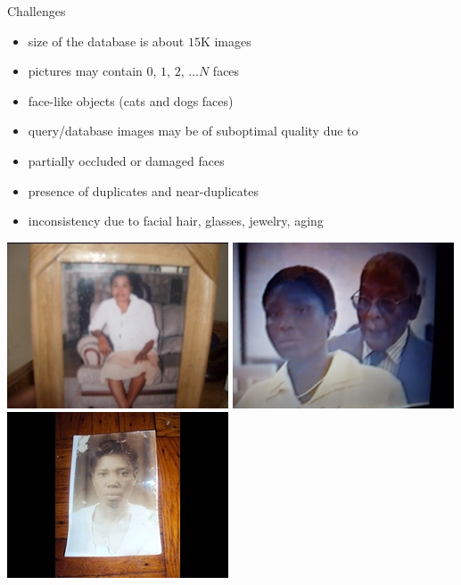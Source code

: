 \begin{xpsectionbox}{Challenges}{}

\begin{minipage}{0.45\linewidth}
\begin{itemize}
	 \item size of the database is about $15$K images
	 \item pictures may contain $0$, $1$, $2$, $\ldots N$ faces
	 \item face-like objects (cats and dogs faces)
	 \item query/database images may be of suboptimal quality due to
	 \item partially occluded or damaged faces
	\item presence of duplicates and near-duplicates
	\item inconsistency due to facial hair, glasses, jewelry, aging

\end{itemize}
\end{minipage}
\begin{minipage}{0.55\linewidth}
\begin{center}

			\vspace{-1cm}
			
			\includegraphics[height=0.22\linewidth]{images/PL_low_quality}
			\includegraphics[height=0.22\linewidth]{images/HEPL_low_quality}
			\includegraphics[height=0.22\linewidth]{images/HEPL_picture_photo}

			\vspace{0.2cm}			
			

\end{center}
\end{minipage}
\end{xpsectionbox}
